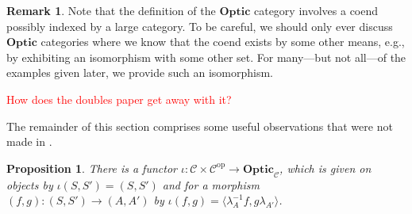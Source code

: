 \documentclass[11pt,a4paper]{article}
\theoremstyle{plain}
\newtheorem{proposition}[theorem]{Proposition}
\theoremstyle{definition}
\newtheorem{remark}[theorem]{Remark}
\newcommand{\C}{\mathscr{C}}
\newcommand{\Optic}{\mathbf{Optic}}
\newcommand{\op}{\mathrm{op}}
\newcommand{\todo}[1]{\textcolor{red}{\small #1}}
\begin{document}
\begin{remark}
Note that the definition of the $\Optic$ category involves a coend possibly indexed by a large category. To be careful, we should only ever discuss $\Optic$ categories where we know that the coend exists by some other means, e.g., by exhibiting an isomorphism with some other set. For many---but not all---of the examples given later, we provide such an isomorphism.

\todo{How does the doubles paper get away with it?}
\end{remark}

The remainder of this section comprises some useful observations that were not made in \cite{Doubles}.

\begin{proposition}
There is a functor $\iota : \C \times \C^\op \to \Optic_\C$, which is given on objects by $\iota(S, S') = (S, S')$ and for a morphism $(f, g) : (S, S') \to (A, A')$ by $\iota(f, g) = \langle \lambda_A^{-1} f, g \lambda_{A'} \rangle$.
\end{proposition}
\end{document}
